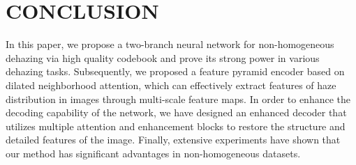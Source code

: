 \documentclass[journal]{IEEEtran}
\begin{document}
\section{CONCLUSION}
In this paper, we propose a two-branch neural network for non-homogeneous dehazing via high quality codebook and prove its strong power in various dehazing tasks. Subsequently, we proposed a feature pyramid encoder based on dilated neighborhood attention, which can effectively extract features of haze distribution in images through multi-scale feature maps. In order to enhance the decoding capability of the network, we have designed an enhanced decoder that utilizes multiple attention and enhancement blocks to restore the structure and detailed features of the image. Finally, extensive experiments have shown that our method has significant advantages in non-homogeneous datasets.



{}
\end{document}
